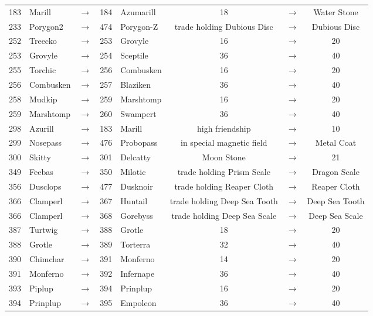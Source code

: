 \documentclass{article}
\begin{document}
\begin{longtable}{rlcrl|ccc}
183 & Marill & $\rightarrow$ & 184 & Azumarill & 18 & $\rightarrow$ & Water Stone \\
233 & Porygon2 & $\rightarrow$ & 474 & Porygon-Z & trade holding Dubious Disc & $\rightarrow$ & Dubious Disc \\
\hline %
252 & Treecko & $\rightarrow$ & 253 & Grovyle & 16 & $\rightarrow$ & 20 \\
253 & Grovyle & $\rightarrow$ & 254 & Sceptile & 36 & $\rightarrow$ & 40 \\
255 & Torchic & $\rightarrow$ & 256 & Combusken & 16 & $\rightarrow$ & 20 \\
256 & Combusken & $\rightarrow$ & 257 & Blaziken & 36 & $\rightarrow$ & 40 \\
258 & Mudkip & $\rightarrow$ & 259 & Marshtomp & 16 & $\rightarrow$ & 20 \\
259 & Marshtomp & $\rightarrow$ & 260 & Swampert & 36 & $\rightarrow$ & 40 \\
298 & Azurill & $\rightarrow$ & 183 & Marill & high friendship & $\rightarrow$ & 10 \\
299 & Nosepass & $\rightarrow$ & 476 & Probopass & in special magnetic field & $\rightarrow$ & Metal Coat \\
300 & Skitty & $\rightarrow$ & 301 & Delcatty & Moon Stone & $\rightarrow$ & 21 \\
349 & Feebas & $\rightarrow$ & 350 & Milotic & trade holding Prism Scale & $\rightarrow$ & Dragon Scale \\
356 & Dusclops & $\rightarrow$ & 477 & Dusknoir & trade holding Reaper Cloth & $\rightarrow$ & Reaper Cloth \\
366 & Clamperl & $\rightarrow$ & 367 & Huntail & trade holding Deep Sea Tooth & $\rightarrow$ & Deep Sea Tooth \\
366 & Clamperl & $\rightarrow$ & 368 & Gorebyss & trade holding Deep Sea Scale & $\rightarrow$ & Deep Sea Scale \\
\hline %
387 & Turtwig & $\rightarrow$ & 388 & Grotle & 18 & $\rightarrow$ & 20 \\
388 & Grotle & $\rightarrow$ & 389 & Torterra & 32 & $\rightarrow$ & 40 \\
390 & Chimchar & $\rightarrow$ & 391 & Monferno & 14 & $\rightarrow$ & 20 \\
391 & Monferno & $\rightarrow$ & 392 & Infernape & 36 & $\rightarrow$ & 40 \\
393 & Piplup & $\rightarrow$ & 394 & Prinplup & 16 & $\rightarrow$ & 20 \\
394 & Prinplup & $\rightarrow$ & 395 & Empoleon & 36 & $\rightarrow$ & 40 \\

\end{longtable}
\end{document}
